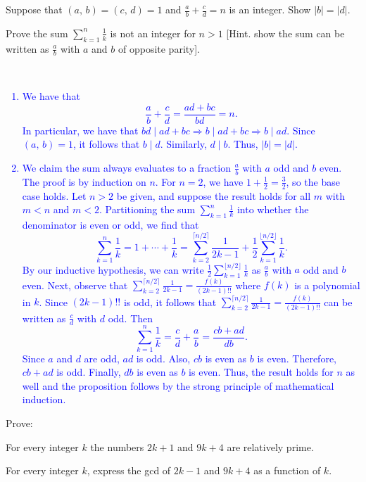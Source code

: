 \documentclass[a4paper,11pt]{article}
\theoremstyle{mythm}
\theoremstyle{mydef}
\newcommand{\blue}[1]{\textcolor{blue}{#1}}
\newcommand{\abs}[1]{\left\vert #1 \right\vert}
\begin{document}
\begin{enumerate*}[{\bf (a)}]
\item Suppose that $(a,\,b) = (c,\,d) = 1$ and $\frac{a}{b}+\frac{c}{d}=n$ is an
  integer. Show $\abs{b}=\abs{d}$.
\item Prove the sum $\sum_{k=1}^n\frac{1}{k}$ is not an integer for $n>1$ [Hint.
  show the sum can be written as $\frac{a}{b}$ with $a$ and $b$ of opposite
  parity].
\end{enumerate*} \\

\blue{
  \begin{enumerate}[{\bf (a)}]
  \item We have that
    \[
      \frac{a}{b}+\frac{c}{d} = \frac{ad+bc}{bd} = n.
    \]
    In particular, we have that $bd \mid ad+bc \Rightarrow b \mid ad+bc
    \Rightarrow b \mid ad$. Since $(a,\,b)=1$, it follows that $b \mid d$.
    Similarly, $d \mid b$. Thus, $\abs{b}=\abs{d}$.
  \item We claim the sum always evaluates to a fraction $\frac{a}{b}$ with $a$
    odd and $b$ even. The proof is by induction on $n$. For $n=2$, we have
    $1+\frac{1}{2} = \frac{3}{2}$, so the base case holds. Let $n>2$ be given,
    and suppose the result holds for all $m$ with $m < n$ and $m < 2$.
    Partitioning the sum $\sum_{k=1}^n\frac{1}{k}$ into whether the denominator
    is even or odd, we find that
    \[
      \sum_{k=1}^n\frac{1}{k} = 1+\cdots+\frac{1}{k} = \sum_{k=2}^{\lceil n/2
        \rceil}\frac{1}{2k-1} + \frac{1}{2}\sum_{k=1}^{\lfloor n/2
        \rfloor}\frac{1}{k}.
    \]
    By our inductive hypothesis, we can write $\frac{1}{2}\sum_{k=1}^{\lfloor
      n/2 \rfloor}\frac{1}{k}$ as $\frac{a}{b}$ with $a$ odd and $b$ even. Next,
    observe that $\sum_{k=2}^{\lceil n/2
      \rceil}\frac{1}{2k-1}=\frac{f(k)}{(2k-1)!!}$ where $f(k)$ is a polynomial
    in $k$. Since $(2k-1)!!$ is odd, it follows that $\sum_{k=2}^{\lceil n/2
      \rceil}\frac{1}{2k-1}=\frac{f(k)}{(2k-1)!!}$ can be written as
    $\frac{c}{d}$ with $d$ odd. Then
    \[
      \sum_{k=1}^n\frac{1}{k} = \frac{c}{d}+\frac{a}{b} = \frac{cb+ad}{db}.
    \]
    Since $a$ and $d$ are odd, $ad$ is odd. Also, $cb$ is even as $b$ is even.
    Therefore, $cb+ad$ is odd. Finally, $db$ is even as $b$ is even. Thus, the
    result holds for $n$ as well and the proposition follows by the strong
    principle of mathematical induction.
\end{enumerate}}

 Prove:
\begin{enumerate*}[{\bf (a)}]
\item For every integer $k$ the numbers $2k+1$ and $9k+4$ are relatively prime.
\item For every integer $k$, express the gcd of $2k-1$ and $9k+4$ as a function
  of $k$.
\end{enumerate*} \\
\end{document}
